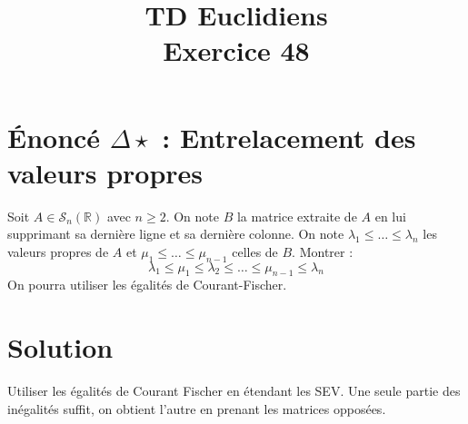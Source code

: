 \documentclass[french]{article}
\title{TD Euclidiens\\ Exercice 48}
\date{}
\newcommand{\R}{\mathbb{R}}
\begin{document}
\maketitle

\section{Énoncé $\Delta\star$ : Entrelacement des valeurs propres}
Soit $A\in\mathcal{S}_n(\R)$ avec $n\geqslant 2$. On note $B$ la matrice extraite de $A$ en lui supprimant sa dernière ligne et sa dernière colonne. On note $\lambda_1\leqslant\ldots\leqslant\lambda_n$ les valeurs propres de $A$ et $\mu_1\leqslant\ldots\leqslant\mu_{n-1}$ celles de $B$. Montrer : $$\lambda_1\leqslant\mu_1\leqslant\lambda_2\leqslant\ldots\leqslant\mu_{n-1}\leqslant\lambda_n$$ On pourra utiliser les égalités de Courant-Fischer.
\section{Solution}
Utiliser les égalités de Courant Fischer en étendant les SEV. Une seule partie des inégalités suffit, on obtient l'autre en prenant les matrices opposées.
\end{document}
